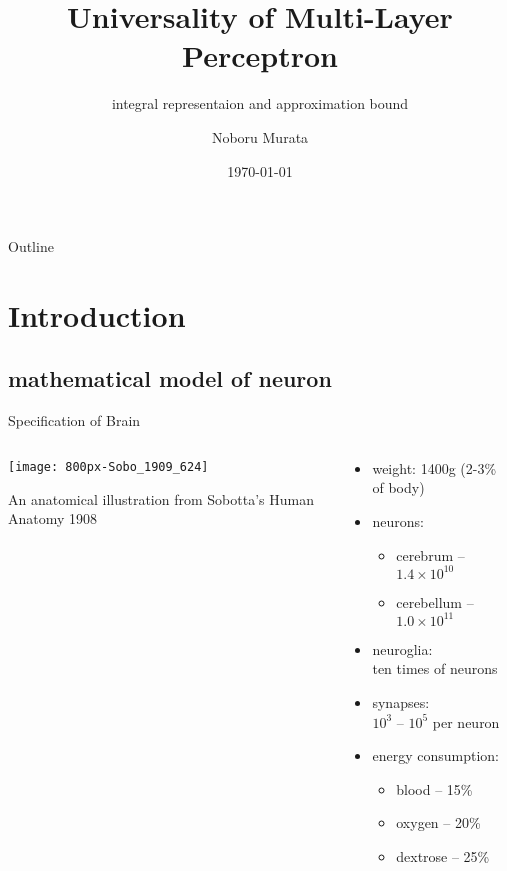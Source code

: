 \documentclass[fleqn,aspectratio=1610]{beamer}
\author{Noboru Murata}
\date{\today}
\title{Universality of Multi-Layer Perceptron}
\subtitle{integral representaion and approximation bound}
\institute{\url{https://noboru-murata.github.io/}}
\begin{document}
\maketitle
\begin{frame}{Outline}
\tableofcontents
\end{frame}


\section{Introduction}
\label{sec:org0a95d8f}
\subsection{mathematical model of neuron}
\label{sec:org249b258}
\begin{frame}[label={sec:orgf1d1d5c}]{Specification of Brain}
\begin{columns}
\begin{column}{0.57\columnwidth}
\begin{center}
\texttt{[image: 800px-Sobo\_1909\_624]}
\\[10pt]
\end{center}
\scriptsize
An anatomical illustration from Sobotta's Human Anatomy 1908
\end{column}
\begin{column}{0.43\columnwidth}
\begin{itemize}
\item weight: 1400g (2-3\% of body)
\item neurons:
\begin{itemize}
\item cerebrum -- \(1.4 \times 10^{10}\)
\item cerebellum -- \(1.0 \times 10^{11}\)
\end{itemize}
\item neuroglia: \\[0pt]
ten times of neurons
\item synapses: \\[0pt]
\(10^{3}\) -- \(10^{5}\) per neuron
\item energy consumption: 
\begin{itemize}
\item blood -- 15\%
\item oxygen -- 20\%
\item dextrose -- 25\%
\end{itemize}
\end{itemize}
\end{column}
\end{columns}
\end{frame}
\end{document}
